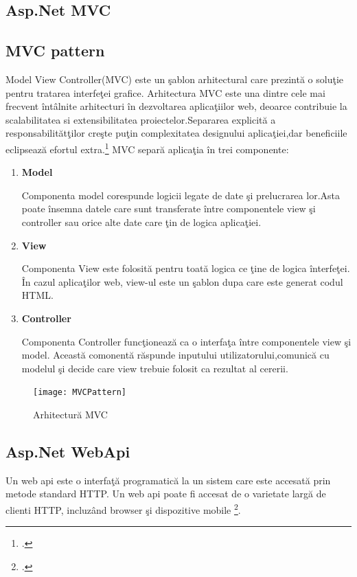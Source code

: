 \documentclass[a4paper,12pt]{report}
\begin{document}
\subsection{Asp.Net MVC}


\subsection{MVC pattern}
Model View Controller(MVC) este un \c sablon arhitectural care prezint\u a o solu\c tie pentru tratarea interfe\c tei grafice.
Arhitectura MVC este una dintre cele mai frecvent \^int\^alnite arhitecturi \^in dezvoltarea aplica\c tiilor web, deoarce
contribuie la scalabilitatea si extensibilitatea proiectelor.Separarea explicit\u a a responsabilit\u at\c tilor
cre\c ste pu\c tin complexitatea designului aplica\c tiei,dar beneficiile eclipseaz\u a efortul extra.\footcite{proAspNetMVC5Pattern}
MVC separ\u a aplica\c tia \^in trei componente:
\begin{enumerate}
	\item \textbf{Model}

		Componenta model corespunde logicii legate de date \c si prelucrarea lor.Asta poate \^insemna
		datele care sunt transferate \^intre componentele view \c si controller sau orice alte date care \c tin de
		logica aplica\c tiei.
	\item \textbf{View}

		Componenta View este folosit\u a pentru toat\u a logica ce \c tine de logica \^ interfe\c tei.
		\^In cazul aplica\c tilor web, view-ul este un \c sablon dupa care este generat codul HTML.
	\item \textbf{Controller}

		Componenta Controller func\c tioneaz\u a ca o interfa\c ta \^intre componentele view \c si model.
		Aceast\u a comonent\u a r\u aspunde inputului utilizatorului,comunic\u a cu modelul \c si decide 
		care view trebuie folosit ca rezultat al cererii.
\end{enumerate}
\begin{figure}[!htb]
	\texttt{[image: MVCPattern]}
	\caption{Arhitectur\u a MVC}
	\label{fig:MVCPattern}
\end{figure}
\subsection{Asp.Net WebApi}
Un web api este o interfa\c t\u a programatic\u a la un sistem care este accesat\u a prin metode standard HTTP.
Un web api poate fi accesat de o varietate larg\u a de clienti HTTP, incluz\^and browser \c si dispozitive mobile \footcite{evolvableWebApi}.
\end{document}
